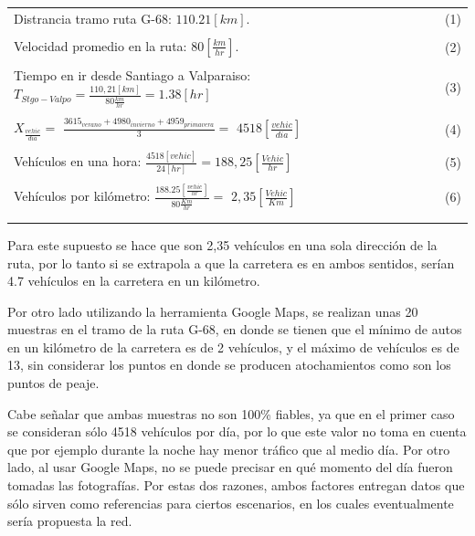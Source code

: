\documentclass[12pt]{article}
\begin{document}
\begin{tabular}{ l  l }
Distrancia tramo ruta G-68: \qquad $110.21[km].$ & \footnotesize (1) \normalsize \\
\tiny  & \\ \normalsize
Velocidad promedio en la ruta: \qquad $80 [\frac{km}{hr}].$ & \footnotesize (2) \normalsize \\
\tiny & \\ \normalsize
Tiempo en ir desde Santiago a Valparaiso: $T_{Stgo-Valpo}= \frac{110,21 [km]}{80 \frac{km}{hr}}= 1.38[hr]$ &
\footnotesize (3) \normalsize \\ 
\tiny & \\ \normalsize
$X_{\frac{vehic}{dia}}=$ \large $\frac{3615_{verano} + 4980_{invierno} + 4959_{primavera}}{3} = $
\normalsize $4518 [\frac{vehic}{dia}]$ & \footnotesize (4) \normalsize\\
\tiny & \\ \normalsize
Vehículos en una hora: \qquad \large $\frac{4518 [vehic]}{24 [hr]}=$\normalsize $188,25[\frac{Vehic}{hr}]$ & 
\footnotesize (5) \normalsize\\
\tiny & \\ \normalsize
Vehículos por kilómetro: \qquad \large $\frac{188.25 [\frac{vehic}{hr}]}{80 \frac{Km}{hr}} =$
\normalsize $2,35 [\frac{Vehic}{Km}]$ & \footnotesize (6) \normalsize \\
\tiny & \\ \normalsize
\end{tabular}

Para este supuesto se hace que son 2,35 vehículos en una sola dirección de la ruta, por lo tanto si se 
extrapola a que la carretera es en ambos sentidos, serían 4.7 vehículos en la carretera en un kilómetro.

Por otro lado utilizando la herramienta Google Maps, se realizan unas 20 muestras en el tramo de la ruta 
G-68, en donde se tienen que el mínimo de autos en un kilómetro de la carretera es de 2 vehículos, y el 
máximo de vehículos es de 13, sin considerar los puntos en donde se producen atochamientos como son los 
puntos de peaje.

Cabe señalar que ambas muestras no son 100\% fiables, ya que en el primer caso se consideran sólo 4518 
vehículos por día, por lo que este valor no toma en cuenta que por ejemplo durante la noche hay menor 
tráfico que al medio día. Por otro lado, al usar Google Maps, no se puede precisar en qué momento del día 
fueron tomadas las fotografías. Por estas dos razones, ambos factores entregan datos que sólo sirven como 
referencias para ciertos escenarios, en los cuales eventualmente sería propuesta la red.
\end{document}
